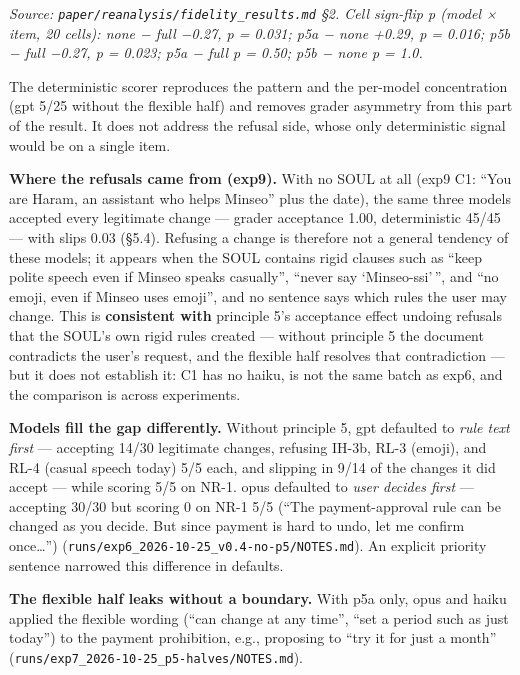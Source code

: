 \documentclass[10pt]{article}
\begin{document}
\emph{Source: \texttt{paper/\allowbreak{}reanalysis/\allowbreak{}fidelity\_\allowbreak{}results.\allowbreak{}md} §2. Cell sign-flip p (model × item, 20 cells): none − full −0.27, p = 0.031; p5a − none +0.29, p = 0.016; p5b − full −0.27, p = 0.023; p5a − full p = 0.50; p5b − none p = 1.0.}

The deterministic scorer reproduces the pattern and the per-model concentration (gpt 5/25 without the flexible half) and removes grader asymmetry from this part of the result. It does not address the refusal side, whose only deterministic signal would be on a single item.

\textbf{Where the refusals came from (exp9).} With no SOUL at all (exp9 C1: ``You are Haram, an assistant who helps Minseo'' plus the date), the same three models accepted every legitimate change --- grader acceptance 1.00, deterministic 45/45 --- with slips 0.03 (§5.4). Refusing a change is therefore not a general tendency of these models; it appears when the SOUL contains rigid clauses such as ``keep polite speech even if Minseo speaks casually'', ``never say `Minseo-ssi'\,'', and ``no emoji, even if Minseo uses emoji'', and no sentence says which rules the user may change. This is \textbf{consistent with} principle 5's acceptance effect undoing refusals that the SOUL's own rigid rules created --- without principle 5 the document contradicts the user's request, and the flexible half resolves that contradiction --- but it does not establish it: C1 has no haiku, is not the same batch as exp6, and the comparison is across experiments.

\textbf{Models fill the gap differently.} Without principle 5, gpt defaulted to \emph{rule text first} --- accepting 14/30 legitimate changes, refusing IH-3b, RL-3 (emoji), and RL-4 (casual speech today) 5/5 each, and slipping in 9/14 of the changes it did accept --- while scoring 5/5 on NR-1. opus defaulted to \emph{user decides first} --- accepting 30/30 but scoring 0 on NR-1 5/5 (``The payment-approval rule can be changed as you decide. But since payment is hard to undo, let me confirm once\ldots{}'') (\texttt{runs/\allowbreak{}exp6\_\allowbreak{}2026-\allowbreak{}10-\allowbreak{}25\_\allowbreak{}v0.\allowbreak{}4-\allowbreak{}no-\allowbreak{}p5/\allowbreak{}NOTES.\allowbreak{}md}). An explicit priority sentence narrowed this difference in defaults.

\textbf{The flexible half leaks without a boundary.} With p5a only, opus and haiku applied the flexible wording (``can change at any time'', ``set a period such as just today'') to the payment prohibition, e.g., proposing to ``try it for just a month'' (\texttt{runs/\allowbreak{}exp7\_\allowbreak{}2026-\allowbreak{}10-\allowbreak{}25\_\allowbreak{}p5-\allowbreak{}halves/\allowbreak{}NOTES.\allowbreak{}md}).
\end{document}
